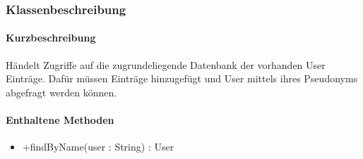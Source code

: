 \subsubsection*{Klassenbeschreibung}%
\paragraph*{Kurzbeschreibung}
Händelt Zugriffe auf die zugrundeliegende Datenbank der vorhanden User Einträge.
Dafür müssen Einträge hinzugefügt und User mittels ihres Pseudonyms abgefragt werden können.
\paragraph*{Enthaltene Methoden}
\begin{itemize}
    \item +findByName(user : String) : User
\end{itemize}
